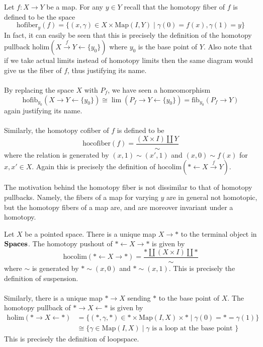 \documentclass[a4paper]{article}
\begin{document}
\begin{eg}{}{} Let $f:X\to Y$ be a map. For any $y\in Y$ recall that the homotopy fiber of $f$ is defined to be the space $$\text{hofiber}_y(f)=\{(x,\gamma)\in X\times\text{Map}(I,Y)\;|\;\gamma(0)=f(x),\gamma(1)=y\}$$ In fact, it can easily be seen that this is precisely the definition of the homotopy pullback $\text{holim}(X\overset{f}{\rightarrow}Y\leftarrow\{y_0\})$ where $y_0$ is the base point of $Y$. Also note that if we take actual limits instead of homotopy limits then the same diagram would give us the fiber of $f$, thus justifying its name. \\~\\

By replacing the space $X$ with $P_f$, we have seen a homeomorphism $$\text{hofib}_{y_0}(X\rightarrow Y\leftarrow\{y_0\})\cong\lim(P_f\rightarrow Y\leftarrow\{y_0\})=\text{fib}_{y_0}(P_f\rightarrow Y)$$ again justifying its name. \\~\\

Similarly, the homotopy cofiber of $f$ is defined to be $$\text{hocofiber}(f)=\frac{(X\times I)\amalg Y}{\sim}$$ where the relation is generated by $(x,1)\sim(x',1)$ and $(x,0)\sim f(x)$ for $x,x'\in X$. Again this is precisely the definition of $\text{hocolim}(\ast\leftarrow X\overset{f}{\rightarrow}Y)$. 
\end{eg}

The motivation behind the homotopy fiber is not dissimilar to that of homotopy pullbacks. Namely, the fibers of a map for varying $y$ are in general not homotopic, but the homotopy fibers of a map are, and are moreover invariant under a homotopy. 

\begin{eg}{}{} Let $X$ be a pointed space. There is a unique map $X\to\ast$ to the terminal object in $\bold{Spaces}$. The homotopy pushout of $\ast\leftarrow X\rightarrow\ast$ is given by $$\text{hocolim}(\ast\leftarrow X\rightarrow\ast)=\frac{\ast\amalg(X\times I)\amalg\ast}{\sim}$$ where $\sim$ is generated by $\ast\sim(x,0)$ and $\ast\sim(x,1)$. This is precisely the definition of suspension. \\~\\

Similarly, there is a unique map $\ast\to X$ sending $\ast$ to the base point of $X$. The homotopy pullback of $\ast\rightarrow X\leftarrow\ast$ is given by 
\begin{align*}
\text{holim}(\ast\rightarrow X\leftarrow\ast)&=\{(\ast,\gamma,\ast)\in\ast\times\text{Map}(I,X)\times\ast\;|\;\gamma(0)=\ast=\gamma(1)\}\\
&\cong\{\gamma\in\text{Map}(I,X)\;|\;\gamma\text{ is a loop at the base point }\}
\end{align*}
This is precisely the definition of loopspace. 
\end{eg}
\end{document}
